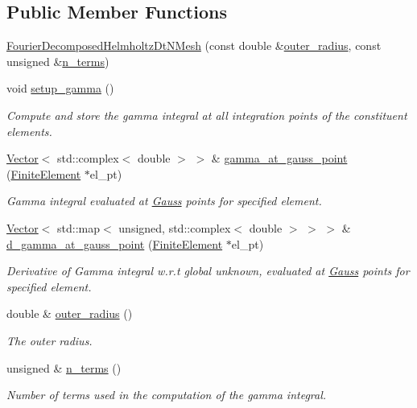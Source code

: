 \subsection*{Public Member Functions}
\begin{DoxyCompactItemize}
\item 
\hyperlink{classoomph_1_1FourierDecomposedHelmholtzDtNMesh_a572d987fdb38434f87aac2e049e905bb}{Fourier\+Decomposed\+Helmholtz\+Dt\+N\+Mesh} (const double \&\hyperlink{classoomph_1_1FourierDecomposedHelmholtzDtNMesh_a6aff7dd5330464d53d9d71d0f6a02dde}{outer\+\_\+radius}, const unsigned \&\hyperlink{classoomph_1_1FourierDecomposedHelmholtzDtNMesh_aef11b1201fcfcc7e1bc868920d803a56}{n\+\_\+terms})
\item 
void \hyperlink{classoomph_1_1FourierDecomposedHelmholtzDtNMesh_a6edd6895062bd0d756f7c4dfc585b284}{setup\+\_\+gamma} ()
\begin{DoxyCompactList}\small\item\em Compute and store the gamma integral at all integration points of the constituent elements. \end{DoxyCompactList}\item 
\hyperlink{classoomph_1_1Vector}{Vector}$<$ std\+::complex$<$ double $>$ $>$ \& \hyperlink{classoomph_1_1FourierDecomposedHelmholtzDtNMesh_a1620b1c9ce32a360c6b6ad89bdaef354}{gamma\+\_\+at\+\_\+gauss\+\_\+point} (\hyperlink{classoomph_1_1FiniteElement}{Finite\+Element} $\ast$el\+\_\+pt)
\begin{DoxyCompactList}\small\item\em Gamma integral evaluated at \hyperlink{classoomph_1_1Gauss}{Gauss} points for specified element. \end{DoxyCompactList}\item 
\hyperlink{classoomph_1_1Vector}{Vector}$<$ std\+::map$<$ unsigned, std\+::complex$<$ double $>$ $>$ $>$ \& \hyperlink{classoomph_1_1FourierDecomposedHelmholtzDtNMesh_a67dab999800a4d2a797d7d146ccbcfca}{d\+\_\+gamma\+\_\+at\+\_\+gauss\+\_\+point} (\hyperlink{classoomph_1_1FiniteElement}{Finite\+Element} $\ast$el\+\_\+pt)
\begin{DoxyCompactList}\small\item\em Derivative of Gamma integral w.\+r.\+t global unknown, evaluated at \hyperlink{classoomph_1_1Gauss}{Gauss} points for specified element. \end{DoxyCompactList}\item 
double \& \hyperlink{classoomph_1_1FourierDecomposedHelmholtzDtNMesh_a6aff7dd5330464d53d9d71d0f6a02dde}{outer\+\_\+radius} ()
\begin{DoxyCompactList}\small\item\em The outer radius. \end{DoxyCompactList}\item 
unsigned \& \hyperlink{classoomph_1_1FourierDecomposedHelmholtzDtNMesh_aef11b1201fcfcc7e1bc868920d803a56}{n\+\_\+terms} ()
\begin{DoxyCompactList}\small\item\em Number of terms used in the computation of the gamma integral. \end{DoxyCompactList}\end{DoxyCompactItemize}
